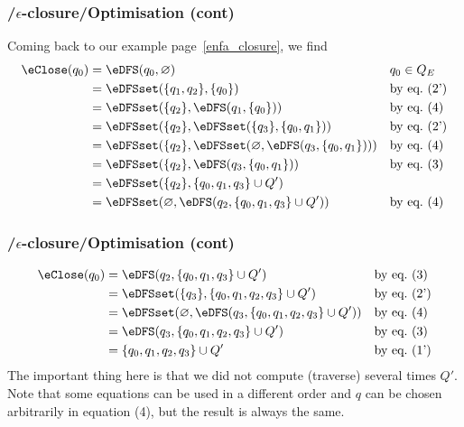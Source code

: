 % 
\begin{frame}
\frametitle{\eNFA{}/\(\epsilon\)-closure/Optimisation (cont)}

Coming back to our example page~\ref{enfa_closure}, we find
\begin{align*}
   \eClose (q_0) 
&= \eDFS (q_0, \varnothing)
&& q_0 \in Q_E\\
&= \eDFSset (\{q_1, q_2\}, \{q_0\})
&& \text{by eq.~(2')}\\
&= \eDFSset (\{q_2\}, \eDFS (q_1, \{q_0\}))
&& \text{by eq.~(4)}\\
&= \eDFSset (\{q_2\}, \eDFSset (\{q_3\}, \{q_0,
   q_1\}))
&& \text{by eq.~(2')}\\
&= \eDFSset (\{q_2\}, \eDFSset (\varnothing, \eDFS (q_3, \{q_0, q_1\})))
&& \text{by eq.~(4)}\\
&= \eDFSset (\{q_2\}, \eDFS (q_3, \{q_0, q_1\}))
&& \text{by eq.~(3)}\\
&= \eDFSset (\{q_2\}, \{q_0, q_1, q_3\} \cup Q')\\
&= \eDFSset (\varnothing, \eDFS (q_2, \{q_0, q_1, q_3\} \cup Q'))
&& \text{by eq.~(4)}
\end{align*}

\end{frame}

% 
\begin{frame}
\frametitle{\eNFA{}/\(\epsilon\)-closure/Optimisation (cont)}

\begin{align*}
   \eClose (q_0) 
&= \eDFS (q_2, \{q_0, q_1, q_3\} \cup Q')
&& \text{by eq.~(3)}\\
&= \eDFSset (\{q_3\}, \{q_0, q_1, q_2, q_3\} \cup Q')
&& \text{by eq.~(2')}\\
&= \eDFSset (\varnothing, \eDFS (q_3, \{q_0, q_1, q_2, q_3\} \cup Q'))
&& \text{by eq.~(4)}\\
&= \eDFS (q_3, \{q_0, q_1, q_2, q_3\} \cup Q')
&& \text{by eq.~(3)}\\
&= \{q_0, q_1, q_2, q_3\} \cup Q'
&& \text{by eq.~(1')}\\
\end{align*}
The important thing here is that we did not compute (traverse) several
times \(Q'\). Note that some equations can be used in a different
order and \(q\) can be chosen arbitrarily in equation (4), but the
result is always the same.

\end{frame}


